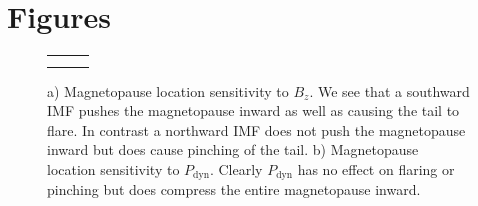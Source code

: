 \documentclass[12pt, letterpaper]{article}
\begin{document}
\section{Figures}
\label{sec:B}
\begin{figure}
\def\tabularxcolumn#1{m{#1}}
\begin{tabularx}{\linewidth}{@{}cXX@{}}
\begin{tabular}{cc}
   & \\
\end{tabular}
\end{tabularx}
\caption{a) Magnetopause location sensitivity to $B_{z}$. We see that a southward IMF pushes the magnetopause inward as well as causing the tail to flare. In contrast a northward IMF does not push the magnetopause inward but does cause pinching of the tail. b) Magnetopause location sensitivity to $P_{\text{dyn}}$. Clearly $P_{\text{dyn}}$ has no effect on flaring or pinching but does compress the entire magnetopause inward.}
\label{fig:sens_magnetopause}
\end{figure}
\end{document}
